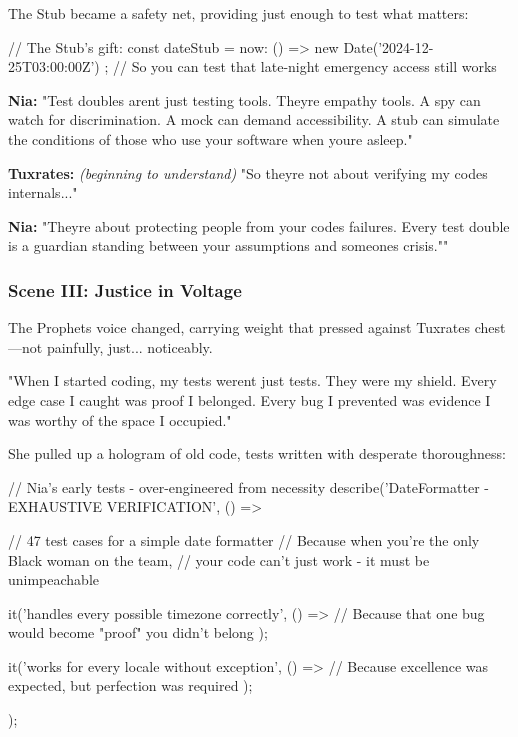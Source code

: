 The Stub became a safety net, providing just enough to test what matters:

\begin{codeblock}
// The Stub's gift:
const dateStub = { 
  now: () => new Date('2024-12-25T03:00:00Z') 
};
// So you can test that late-night emergency access still works
\end{codeblock}

\textbf{Nia:} "Test doubles aren\textquotesingle t just testing tools. They\textquotesingle re empathy tools. A spy can watch for discrimination. A mock can demand accessibility. A stub can simulate the conditions of those who use your software when you\textquotesingle re asleep."

\textbf{Tuxrates:} \emph{(beginning to understand)} "So they\textquotesingle re not about verifying my code\textquotesingle s internals..."

\textbf{Nia:} "They\textquotesingle re about protecting people from your code\textquotesingle s failures. Every test double is a guardian standing between your assumptions and someone\textquotesingle s crisis.""

\bookdivider

\subsubsection{Scene III: Justice in Voltage}\label{scene-iii-justice-in-voltage}

The Prophet\textquotesingle s voice changed, carrying weight that pressed against Tuxrates\textquotesingle{} chest---not painfully, just... noticeably.

"When I started coding, my tests weren\textquotesingle t just tests. They were my shield. Every edge case I caught was proof I belonged. Every bug I prevented was evidence I was worthy of the space I occupied."

She pulled up a hologram of old code, tests written with desperate thoroughness:

\begin{codeblock}
// Nia's early tests - over-engineered from necessity
describe('DateFormatter - EXHAUSTIVE VERIFICATION', () => {
  // 47 test cases for a simple date formatter
  // Because when you're the only Black woman on the team,
  // your code can't just work - it must be unimpeachable
  
  it('handles every possible timezone correctly', () => {
    // Because that one bug would become "proof" you didn't belong
  });
  
  it('works for every locale without exception', () => {
    // Because excellence was expected, but perfection was required
  });
});
\end{codeblock}


